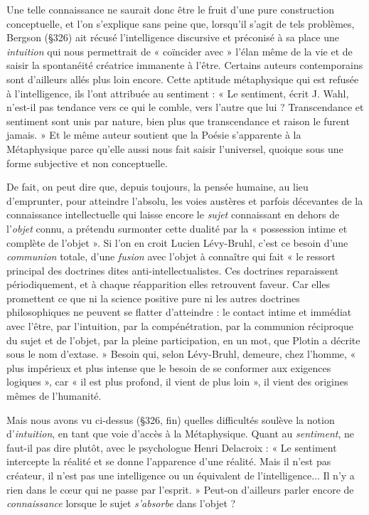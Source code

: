 Une telle connaissance ne saurait donc être le fruit d’une pure
construction conceptuelle, et l’on s’explique sans peine que, lorsqu'il
s’agit de tels problèmes, Bergson (\S 326) ait récusé l'intelligence
discursive et préconisé à sa place une {\it intuition} qui nous permettrait
de « coïncider avec » l'élan même de la vie et de saisir la spontanéité
créatrice immanente à l’être. Certains auteurs contemporains sont
d’ailleurs allés plus loin encore. Cette aptitude métaphysique qui est
refusée à l'intelligence, ils l’ont attribuée au sentiment : « Le sentiment,
écrit J. Wahl, n'est-il pas tendance vers ce qui le comble, vers l’autre
que lui ? Transcendance et sentiment sont unis par nature, bien plus
que transcendance et raison le furent jamais. » Et le même auteur soutient
que la Poésie s'apparente à la Métaphysique parce qu’elle aussi
nous fait saisir l’universel, quoique sous une forme subjective et non
conceptuelle.

De fait, on peut dire que, depuis toujours, la pensée humaine, au
lieu d'emprunter, pour atteindre l’absolu, les voies austères et parfois
décevantes de la connaissance intellectuelle qui laisse encore le {\it sujet}
connaissant en dehors de l’{\it objet} connu, a prétendu surmonter cette
dualité par la « possession intime et complète de l’objet ». Si l’on en
croit Lucien Lévy-Bruhl, c’est ce besoin d’une {\it communion} totale,
d’une {\it fusion} avec l’objet à connaître qui fait « le ressort principal des
doctrines dites anti-intellectualistes. Ces doctrines reparaissent périodiquement,
et à chaque réapparition elles retrouvent faveur. Car elles
promettent ce que ni la science positive pure ni les autres doctrines
philosophiques ne peuvent se flatter d’atteindre : le contact intime et
immédiat avec l'être, par l'intuition, par la compénétration, par la
communion réciproque du sujet et de l’objet, par la pleine participation,
en un mot, que Plotin a décrite sous le nom d’extase. » Besoin
qui, selon Lévy-Bruhl, demeure, chez l’homme, « plus impérieux et
plus intense que le besoin de se conformer aux exigences logiques »,
car « il est plus profond, il vient de plus loin », il vient des origines
mêmes de l’humanité.

Mais nous avons vu ci-dessus (\S 326, fin) quelles difficultés soulève
la notion d’{\it intuition}, en tant que voie d'accès à la Métaphysique.
Quant au {\it sentiment}, ne faut-il pas dire plutôt, avec le psychologue
Henri Delacroix : « Le sentiment intercepte la réalité et se donne
l'apparence d’une réalité. Mais il n’est pas créateur, il n’est pas une
intelligence ou un équivalent de l’intelligence... Il n’y a rien dans le
cœur qui ne passe par l'esprit. » Peut-on d’ailleurs parler encore de
{\it connaissance} lorsque le sujet {\it s’absorbe} dans l’objet ?

